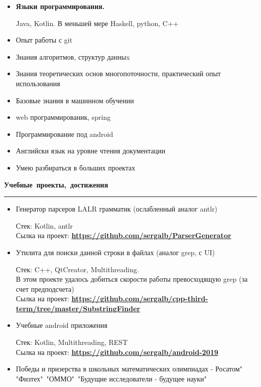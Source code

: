 \documentclass[11pt,a4paper]{report}
\begin{document}
    \begin{itemize}

        \item \textbf{Языки программирования.}

        Java, Kotlin. В меньшей мере Haskell, python, C++

        \item Опыт работы с git
        \item Знания алгоритмов, структур данныx
        \item Знания теоретических основ многопоточности, практический опыт использования
        \item Базовые знания в машинном обучении
        \item web программированик, spring
        \item Программирование под android
        \item Английски язык на уровне чтения документации
        \item Умею разбираться в больших проектах
    \end{itemize}




    \par\hbox{\Large\textbf{Учебные проекты, достижения}}\kern5pt\hrule\kern5pt
    \begin{itemize}

        \item Генератор парсеров LALR грамматик (ослабленный аналог antlr)

        Стек: Kotlin, antlr\\
        Сылка на проект:
        \textbf{
        \url{https://github.com/sergalb/ParserGenerator}
        }

        \item Утилита для поиски данной строки в файлах (аналог grep, с UI)

        Стек: C++, QtCreator, Multithreading.\\
        В этом проекте удалось добиться скорости работы превосходящую grep (за счет предподсчета)\\
        Сылка на проект:
        \textbf{
        \url{https://github.com/sergalb/cpp-third-term/tree/master/SubstringFinder}
        }

        \item Учебные android приложения

        Стек: Kotlin, Multithreading, REST\\
        Сылка на проект:
        \textbf{
        \url{https://github.com/sergalb/android-2019}
        }

        \item Победы и призерства в школьных математических олимпиадах - Росатом"\, "Физтех"\, "ОММО"\, "Будущие исследователи - будущее науки"

    \end{itemize}
\end{document}
